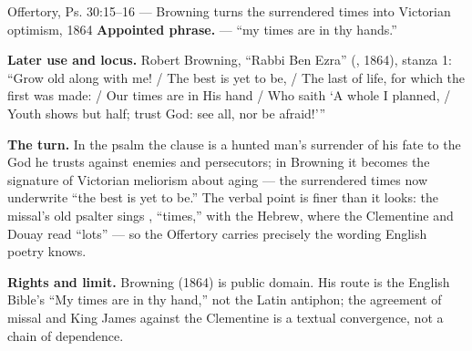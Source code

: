 \begin{afterlife}{Offertory, Ps. 30:15--16 --- Browning turns the surrendered times into Victorian optimism, 1864}
\textbf{Appointed phrase.}  --- ``my times
are in thy hands.''

\textbf{Later use and locus.} Robert Browning, ``Rabbi Ben Ezra''
(, 1864), stanza 1: ``Grow old along with me! / The
best is yet to be, / The last of life, for which the first was made: / Our
times are in His hand / Who saith `A whole I planned, / Youth shows but half;
trust God: see all, nor be afraid!'''

\textbf{The turn.} In the psalm the clause is a hunted man's surrender of his
fate to the God he trusts against enemies and persecutors; in Browning it
becomes the signature of Victorian meliorism about aging --- the surrendered
times now underwrite ``the best is yet to be.'' The verbal point is finer
than it looks: the missal's old psalter sings , ``times,''
with the Hebrew, where the Clementine and Douay read ``lots'' --- so the
Offertory carries precisely the wording English poetry knows.

\textbf{Rights and limit.} Browning (1864) is public domain. His route is the
English Bible's ``My times are in thy hand,'' not the Latin antiphon; the
agreement of missal and King James against the Clementine is a textual
convergence, not a chain of dependence.
\end{afterlife}
